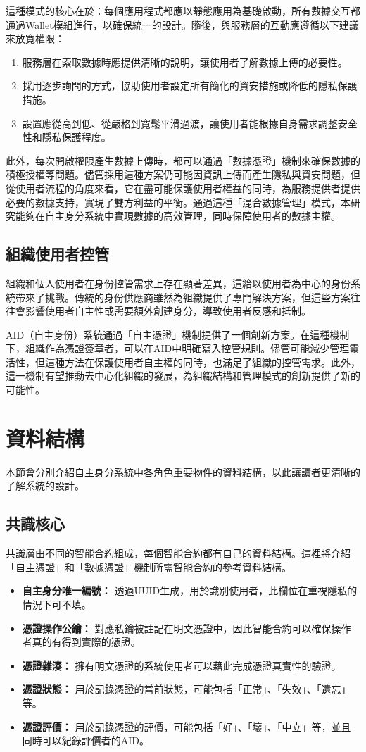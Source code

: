 這種模式的核心在於：每個應用程式都應以靜態應用為基礎啟動，所有數據交互都通過Wallet模組進行，以確保統一的設計。隨後，與服務層的互動應遵循以下建議來放寬權限：
\begin{enumerate}
  \item 服務層在索取數據時應提供清晰的說明，讓使用者了解數據上傳的必要性。
  \item 採用逐步詢問的方式，協助使用者設定所有簡化的資安措施或降低的隱私保護措施。
  \item 設置應從高到低、從嚴格到寬鬆平滑過渡，讓使用者能根據自身需求調整安全性和隱私保護程度。
\end{enumerate}
此外，每次開啟權限產生數據上傳時，都可以通過「數據憑證」機制來確保數據的積極授權等問題。儘管採用這種方案仍可能因資訊上傳而產生隱私與資安問題，但從使用者流程的角度來看，它在盡可能保護使用者權益的同時，為服務提供者提供必要的數據支持，實現了雙方利益的平衡。通過這種「混合數據管理」模式，本研究能夠在自主身分系統中實現數據的高效管理，同時保障使用者的數據主權。
\subsection{組織使用者控管}
組織和個人使用者在身份控管需求上存在顯著差異，這給以使用者為中心的身份系統帶來了挑戰。傳統的身份供應商雖然為組織提供了專門解決方案，但這些方案往往會影響使用者自主性或需要額外創建身分，導致使用者反感和抵制。

AID（自主身份）系統通過「自主憑證」機制提供了一個創新方案。在這種機制下，組織作為憑證簽章者，可以在AID中明確寫入控管規則。儘管可能減少管理靈活性，但這種方法在保護使用者自主權的同時，也滿足了組織的控管需求。此外，這一機制有望推動去中心化組織的發展，為組織結構和管理模式的創新提供了新的可能性。
\section{資料結構}
本節會分別介紹自主身分系統中各角色重要物件的資料結構，以此讓讀者更清晰的了解系統的設計。
\subsection{共識核心}
共識層由不同的智能合約組成，每個智能合約都有自己的資料結構。這裡將介紹「自主憑證」和「數據憑證」機制所需智能合約的參考資料結構。
\begin{itemize}
  \item \textbf{自主身分唯一編號：} 透過UUID生成，用於識別使用者，此欄位在重視隱私的情況下可不填。
  \item \textbf{憑證操作公鑰：} 對應私鑰被註記在明文憑證中，因此智能合約可以確保操作者真的有得到實際的憑證。
  \item \textbf{憑證雜湊：} 擁有明文憑證的系統使用者可以藉此完成憑證真實性的驗證。
  \item \textbf{憑證狀態：} 用於記錄憑證的當前狀態，可能包括「正常」、「失效」、「遺忘」等。
  \item \textbf{憑證評價：} 用於記錄憑證的評價，可能包括「好」、「壞」、「中立」等，並且同時可以紀錄評價者的AID。
\end{itemize}
